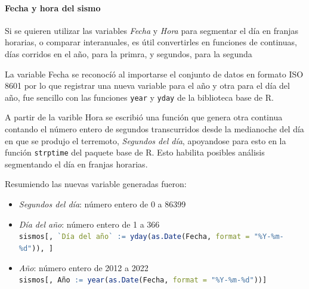 \documentclass[a4paper]{report}
\begin{document}
\paragraph{Fecha y hora del sismo}
Si se quieren utilizar las variables \emph{Fecha} y \emph{Hora} para segmentar el día en franjas horarias, o comparar interanuales, es útil convertirles en funciones de continuas, días corridos en el año, para la primra, y segundos, para la segunda 

La variable Fecha se reconocíó al importarse el conjunto de datos en formato ISO 8601 por lo que registrar una nueva variable para el año y otra para el día del año, fue sencillo con las funciones \lstinline[language = R]'year' y \lstinline[language = R]'yday' de la biblioteca base de R. 

A partir de la varible Hora se escribió una función que genera otra continua contando el número entero de segundos transcurridos desde la medianoche del día en que se produjo el terremoto, \emph{Segundos del día}, apoyandose para esto en la función \lstinline[language = R]'strptime' del paquete base de R.
Esto habilita posibles análisis segmentando el día en franjas horarias.


Resumiendo las nuevas variable generadas fueron:
\begin{itemize}
	\item \emph{Segundos del día}: número entero de 0 a 86399
	\item \emph{Día del año}: número entero de 1 a 366\\
		\lstinline[language = R]'sismos[, `Día del año` := yday(as.Date(Fecha, format = "%Y-%m-%d")), ]'
	\item \emph{Año}: número entero de 2012 a 2022\\
	\lstinline[language = R]'sismos[, Año := year(as.Date(Fecha, format = "%Y-%m-%d"))]'
\end{itemize}


\end{document}
